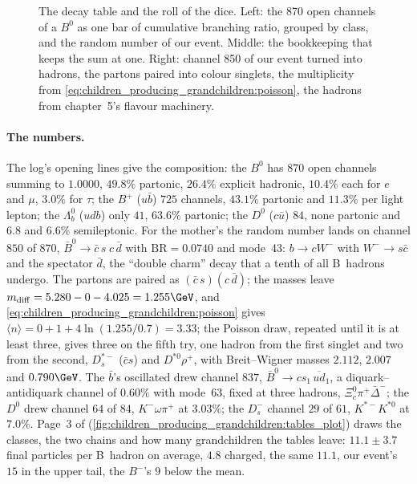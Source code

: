\begin{figure}[htbp]\centering
\resizebox{\textwidth}{!}{}
\caption[The decay table as a bar, the  bookkeeping and a
partonic channel turned into hadrons]{The decay table and the roll of the
dice. Left: the 870 open channels of a $B^0$ as one bar of cumulative
branching ratio, grouped by class, and the random number of our event.
Middle: the  bookkeeping that keeps the sum at one. Right:
channel 850 of our event turned into hadrons, the partons paired into
colour singlets, the multiplicity from
\cref{eq:children_producing_grandchildren:poisson}, the hadrons from
chapter~5's flavour machinery.}
\label{fig:children_producing_grandchildren:tables_sketch}
\end{figure}

\paragraph{The numbers.} The log's opening lines give the composition:
the $B^0$ has $870$ open channels summing to $1.0000$, $49.8\%$ partonic,
$26.4\%$ explicit hadronic, $10.4\%$ each for $e$ and $\mu$, $3.0\%$ for
$\tau$; the $B^+$ ($u\bar b$) $725$ channels, $43.1\%$ partonic and
$11.3\%$ per light lepton; the $\Lambda_b^0$ ($udb$) only $41$, $63.6\%$
partonic; the $D^0$ ($c\bar u$) $84$, none partonic and $6.8$ and $6.6\%$
semileptonic. For the mother's \Bbar the random number lands on channel
$850$ of $870$, $\bar B^0\to\bar c\,s\;c\,\bar d$ with $\mathrm{BR}=0.0740$
and mode~43: $b\to cW^-$ with $W^-\to s\bar c$ and the spectator $\bar d$,
the ``double charm'' decay that a tenth of all B~hadrons undergo. The
partons are paired as $(\bar c\,s)(c\,\bar d)$; the masses leave
$m_{\mathrm{diff}}=5.280-0-4.025=1.255\GeV$, and
\cref{eq:children_producing_grandchildren:poisson} gives
$\langle n\rangle=0+1+4\ln(1.255/0.7)=3.33$; the Poisson draw, repeated
until it is at least three, gives three on the fifth try, one hadron from
the first singlet and two from the second, $D_s^{*-}$ ($\bar cs$) and
$D^{*0}\rho^+$, with Breit--Wigner masses $2.112$, $2.007$ and $0.790\GeV$.
The $\bar b$'s oscillated \Bbar drew channel $837$, $\bar B^0\to cs_1\,\overline{ud}_1$,
a diquark--antidiquark channel of $0.60\%$ with mode~63, fixed at three
hadrons, $\Xi_c^0\pi^+\bar\Delta^-$; the $D^0$ drew channel $64$ of $84$,
$K^-\omega\pi^+$ at $3.03\%$; the $D_s^-$ channel $29$ of $61$,
$K^{*-}K^{*0}$ at $7.0\%$. Page~3 of 
(\cref{fig:children_producing_grandchildren:tables_plot}) draws the
classes, the two chains and how many grandchildren the tables leave:
$11.1\pm3.7$ final particles per B~hadron on average, $4.8$ charged,
\PYTHIA the same $11.1$, our event's $15$ in the upper tail, the \CMSSW
$B^-$'s $9$ below the mean.

